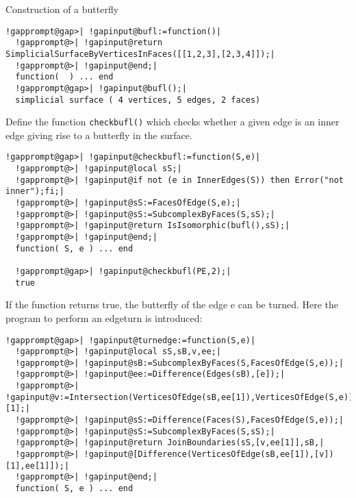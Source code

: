 \documentclass[a4paper,11pt]{report}
\begin{document}
{{{ Construction of a butterfly 

 
\begin{Verbatim}[commandchars=!@|,fontsize=\small,frame=single,label=Example]
  !gapprompt@gap>| !gapinput@bufl:=function()|
  !gapprompt@>| !gapinput@return SimplicialSurfaceByVerticesInFaces([[1,2,3],[2,3,4]]);|
  !gapprompt@>| !gapinput@end;|
  function(  ) ... end
  !gapprompt@gap>| !gapinput@bufl();|
  simplicial surface ( 4 vertices, 5 edges, 2 faces)
\end{Verbatim}
 

 
\begin{center}

\end{center}
 Define the function \texttt{checkbufl()} which checks whether a given edge is an inner edge giving rise to a butterfly
in the surface. 

 
\begin{Verbatim}[commandchars=!@|,fontsize=\small,frame=single,label=Example]
  !gapprompt@gap>| !gapinput@checkbufl:=function(S,e)|
  !gapprompt@>| !gapinput@local sS;|
  !gapprompt@>| !gapinput@if not (e in InnerEdges(S)) then Error("not inner");fi;|
  !gapprompt@>| !gapinput@sS:=FacesOfEdge(S,e);|
  !gapprompt@>| !gapinput@sS:=SubcomplexByFaces(S,sS);|
  !gapprompt@>| !gapinput@return IsIsomorphic(bufl(),sS);|
  !gapprompt@>| !gapinput@end;|
  function( S, e ) ... end
  
  !gapprompt@gap>| !gapinput@checkbufl(PE,2);|
  true
\end{Verbatim}
 

 If the function returns true, the butterfly of the edge e can be turned. Here
the program to perform an edgeturn is introduced: 
\begin{Verbatim}[commandchars=!@|,fontsize=\small,frame=single,label=Example]
  !gapprompt@gap>| !gapinput@turnedge:=function(S,e)|
  !gapprompt@>| !gapinput@local sS,sB,v,ee;|
  !gapprompt@>| !gapinput@sB:=SubcomplexByFaces(S,FacesOfEdge(S,e));|
  !gapprompt@>| !gapinput@ee:=Difference(Edges(sB),[e]);|
  !gapprompt@>| !gapinput@v:=Intersection(VerticesOfEdge(sB,ee[1]),VerticesOfEdge(S,e))[1];|
  !gapprompt@>| !gapinput@sS:=Difference(Faces(S),FacesOfEdge(S,e));|
  !gapprompt@>| !gapinput@sS:=SubcomplexByFaces(S,sS);|
  !gapprompt@>| !gapinput@return JoinBoundaries(sS,[v,ee[1]],sB,|
  !gapprompt@>| !gapinput@[Difference(VerticesOfEdge(sB,ee[1]),[v])[1],ee[1]]);|
  !gapprompt@>| !gapinput@end;|
  function( S, e ) ... end
\end{Verbatim}
 

}}}
\end{document}
